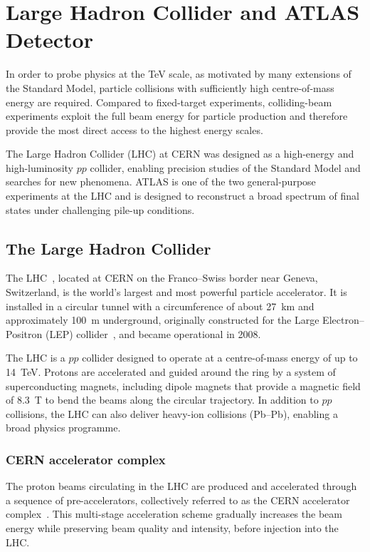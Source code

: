 ﻿%

\chapter{Large Hadron Collider and ATLAS Detector}
\label{chap:instrument}

In order to probe physics at the TeV scale, as motivated by many extensions of the Standard Model, 
particle collisions with sufficiently high centre-of-mass energy are required.
Compared to fixed-target experiments, colliding-beam experiments exploit the full beam energy for particle production and therefore provide the most direct access to the highest energy scales.

The Large Hadron Collider (LHC) at CERN was designed as a high-energy and high-luminosity $pp$ collider, 
enabling precision studies of the Standard Model and searches for new phenomena. 
ATLAS is one of the two general-purpose experiments at the LHC and is designed to reconstruct a broad spectrum of final states under challenging pile-up conditions.

\section{The Large Hadron Collider}

The LHC~\cite{LHCDR2004}, located at CERN on the Franco--Swiss border near Geneva, Switzerland, 
is the world's largest and most powerful particle accelerator.
It is installed in a circular tunnel with a circumference of about 27~km and approximately 100~m underground, originally constructed for the Large Electron--Positron (LEP) collider~\cite{LEPDRv1,LEPDRv2}, and became operational in 2008.

The LHC is a $pp$ collider designed to operate at a centre-of-mass energy of up to 14~TeV. 
Protons are accelerated and guided around the ring by a system of superconducting magnets, including dipole magnets that provide a magnetic field of 8.3~T to bend the beams along the circular trajectory. 
In addition to $pp$ collisions, the LHC can also deliver heavy-ion collisions (Pb--Pb), enabling a broad physics programme.

\subsection{CERN accelerator complex}

The proton beams circulating in the LHC are produced and accelerated through a sequence of pre-accelerators, collectively referred to as the CERN accelerator complex~\cite{Bruning2012LHCReview}. 
This multi-stage acceleration scheme gradually increases the beam energy while preserving beam quality and intensity, before injection into the LHC.

